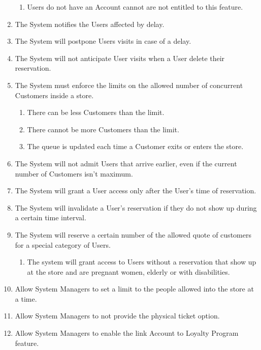\begin{enumerate}
\begin{enumerate}
            \item Users do not have an Account cannot are not entitled to this feature.
        \end{enumerate}
    \item The System notifies the Users affected by delay.
    \item The System will postpone Users visits in case of a delay.
    \item The System will not anticipate User visits when a User delete their reservation.
    \item The System must enforce the limits on the allowed number of concurrent Customers inside a store.
        \begin{enumerate}
            \item There can be less Customers than the limit.
            \item There cannot be more Customers than the limit.
            \item The queue is updated each time a Customer exits or enters the store.
        \end{enumerate}
    \item The System will not admit Users that arrive earlier, even if the current number of Customers isn't maximum.
    \item The System will grant a User access only after the User's time of reservation.
    \item The System will invalidate a User's reservation if they do not show up during a certain time interval.
    \item The System will reserve a certain number of the allowed quote of customers for a special category of Users.
        \begin{enumerate}
            \item The system will grant access to Users without a reservation that show up at the store and are pregnant women, elderly or with disabilities.
        \end{enumerate}
    \item Allow System Managers to set a limit to the people allowed into the store at a time.
    \item Allow System Managers to not provide the physical ticket option.
    \item Allow System Managers to enable the link Account to Loyalty Program feature.
\end{enumerate}

